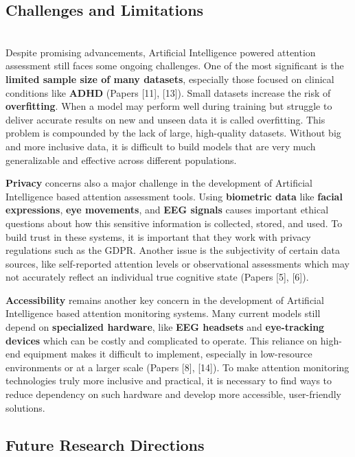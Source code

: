 \documentclass[12pt]{article}
\begin{document}
\subsection{ Challenges and Limitations} \\ 

Despite promising advancements, Artificial Intelligence powered attention assessment still faces some ongoing challenges. One of the most significant is the \textbf{limited sample size of many datasets}, especially those focused on clinical conditions like \textbf{ADHD} (Papers [11], [13]). Small datasets increase the risk of \textbf{overfitting}. When a model may perform well during training but struggle to deliver accurate results on new and unseen data it is called overfitting. This problem is compounded by the lack of large, high-quality datasets. Without big and more inclusive data, it is difficult to build models that are very much generalizable and effective across different populations.

\textbf{Privacy} concerns also a major challenge in the development of Artificial Intelligence based attention assessment tools. Using \textbf{biometric data} like \textbf{facial expressions}, \textbf{eye movements}, and \textbf{EEG signals} causes important ethical questions about how this sensitive information is collected, stored, and used. To build trust in these systems, it is important that they work with privacy regulations such as the GDPR. Another issue is the subjectivity of certain data sources, like self-reported attention levels or observational assessments which may not accurately reflect an individual true cognitive state (Papers [5], [6]).

\textbf{Accessibility} remains another key concern in the development of Artificial Intelligence based attention monitoring systems. Many current models still depend on \textbf{specialized hardware}, like \textbf{EEG headsets} and \textbf{eye-tracking devices} which can be costly and complicated to operate. This reliance on high-end equipment makes it difficult to implement, especially in low-resource environments or at a larger scale (Papers [8], [14]). To make attention monitoring technologies truly more inclusive and practical, it is necessary to find ways to reduce dependency on such hardware and develop more accessible, user-friendly solutions.

\subsection{ Future Research Directions} \\
\end{document}
